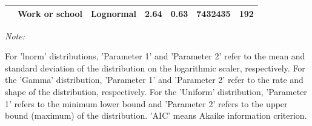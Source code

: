 \documentclass[preprint, 3p,
authoryear]{elsarticle} %
\begin{document}
\begin{table}
{\begin{threeparttable}
\begin{tabular}[t]{rllrrrr}
\multirow[t]{-12}{*}{\raggedleft\arraybackslash 2022} & Work or school & Lognormal & 2.64 & 0.63 & 7432435 & 192\\
\bottomrule
\end{tabular}
\begin{tablenotes}
\item \textit{Note: } 
\item For 'lnorm' distributions, 'Parameter 1' and 'Parameter 2' refer to the mean and standard deviation of the distribution on the logarithmic scaler, respectively. For the 'Gamma' distribution, 'Parameter 1' and 'Parameter 2' refer to the rate and shape of the distribution, respectively. For the 'Uniform' distribution,  'Parameter 1' refers to the minimum lower bound and 'Parameter 2'  refers to the upper bound (maximum) of the distribution.  'AIC' means Akaike information criterion.
\end{tablenotes}
\end{threeparttable}}
\end{table}
\end{document}
